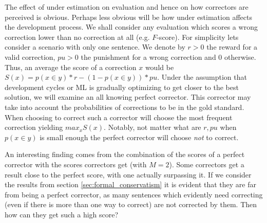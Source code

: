 \documentclass[letter,11pt]{article}
\newcommand{\com}[1]{}
\newcommand{\lc}[1]{\footnote{\color{green}LC: #1}}
\begin{document}
		
		
		The effect of under estimation on evaluation and hence on how correctors are perceived is obvious. 
		Perhaps less obvious will be how under estimation affects the development
		process. We shall consider any evaluation which scores a wrong correction lower than no correction at all (e.g. $F$-score). For simplicity lets consider a scenario with only one sentence. We denote by $r>0$ the reward for a valid correction, $pu>0$ the punishment for a wrong correction and 0 otherwise. Thus, an average the score of a correction $x$ would be $S\left(x\right) = p\left(x\in y\right)*r - \left(1-p\left(x\in y\right)\right)*pu$.
		Under the assumption that development cycles or ML is gradually optimizing to get closer to the best solution, we will examine an all knowing perfect corrector.
		This corrector may take into account the probabilities of corrections to be in the gold standard. When choosing to correct such a corrector will choose the most frequent correction yielding $max_xS\left(x\right)$. Notably, not matter what are $r, pu$ when $p\left(x\in y\right)$ is small enough the perfect corrector will choose \emph{not} to correct.
		
		An interesting finding comes from the combination of the scores of a perfect corrector with the scores correctors get (with $M=2$). Some correctors get a result close to the perfect score, with one actually surpassing it. If we consider the results from section \ref{sec:formal_conservatism} it is evident that they are far from being a perfect corrector, as many sentences which evidently need correcting (even if there is more than one way to correct) are not corrected by them. Then how can they get such a high score?
		
		\com{\lc{Is that the right place for this general discussion of when can a system over-correct? Isn't that a prediction that drives us to look at the multi reference? I can't find any other place in which we discuss why over conservatism comes from this problem. could it be? where should this argument come?}
		Consider an all knowing perfect corrector, this corrector takes into account the evaluation coverage and knows the probabilities of corrections to be in the gold standard. Such a corrector will choose the most frequent correction, or no correction at all.  Notably, it will choose not correct when the increase in precision when the correction is in the gold standard contributes in expectation less to the $F$ score than the loss in recall for the times it is not in the gold standard.}
		
\end{document}
